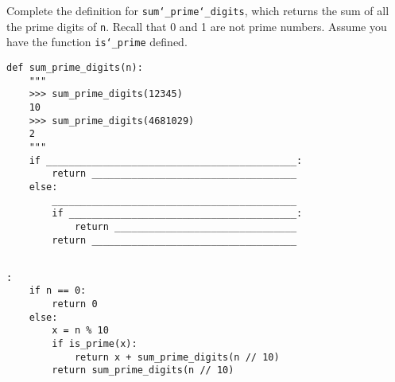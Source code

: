 \begin{blocksection}
\question Complete the definition for \texttt{sum\char`_prime\char`_digits}, which returns the sum of all the prime digits of \texttt{n}. Recall that 0 and 1 are not prime numbers. Assume you have the function \texttt{is\char`_prime} defined. \\

\begin{lstlisting}
def sum_prime_digits(n):
    """
    >>> sum_prime_digits(12345)
    10
    >>> sum_prime_digits(4681029)
    2
    """
    if ____________________________________________:		
        return ____________________________________	
    else:
        ___________________________________________			
        if ________________________________________:		
            return ________________________________				
        return ____________________________________
				
\end{lstlisting}

\begin{solution}[1in]
\begin{lstlisting}:
    if n == 0:
        return 0
    else:
        x = n % 10
        if is_prime(x):
            return x + sum_prime_digits(n // 10)
        return sum_prime_digits(n // 10)
\end{lstlisting}
\end{solution}
\end{blocksection}
